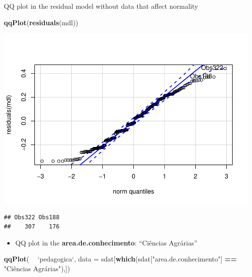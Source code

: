 \documentclass[]{article}
\newenvironment{Shaded}{\begin{snugshade}}{\end{snugshade}}
\newcommand{\DataTypeTok}[1]{\textcolor[rgb]{0.13,0.29,0.53}{#1}}
\newcommand{\KeywordTok}[1]{\textcolor[rgb]{0.13,0.29,0.53}{\textbf{#1}}}
\newcommand{\NormalTok}[1]{#1}
\newcommand{\OperatorTok}[1]{\textcolor[rgb]{0.81,0.36,0.00}{\textbf{#1}}}
\newcommand{\StringTok}[1]{\textcolor[rgb]{0.31,0.60,0.02}{#1}}
\providecommand{\tightlist}{%
  \setlength{\itemsep}{0pt}\setlength{\parskip}{0pt}}
\begin{document}
QQ plot in the residual model without data that affect normality

\begin{Shaded}
\begin{Highlighting}[]
\KeywordTok{qqPlot}\NormalTok{(}\KeywordTok{residuals}\NormalTok{(mdl))}
\end{Highlighting}
\end{Shaded}

\includegraphics{factorialAnova_files/figure-latex/unnamed-chunk-24-1.pdf}

\begin{verbatim}
## Obs322 Obs188 
##    307    176
\end{verbatim}

\begin{itemize}
\tightlist
\item
  QQ plot in the \textbf{area.de.conhecimento}: ``Ciências Agrárias''
\end{itemize}

\begin{Shaded}
\begin{Highlighting}[]
\KeywordTok{qqPlot}\NormalTok{( }\OperatorTok{~}\StringTok{ `}\DataTypeTok{pedagogica}\StringTok{`}\NormalTok{, }\DataTypeTok{data =}\NormalTok{ sdat[}\KeywordTok{which}\NormalTok{(sdat[}\StringTok{"area.de.conhecimento"}\NormalTok{] }\OperatorTok{==}\StringTok{ "Ciências Agrárias"}\NormalTok{),])}
\end{Highlighting}
\end{Shaded}
\end{document}
